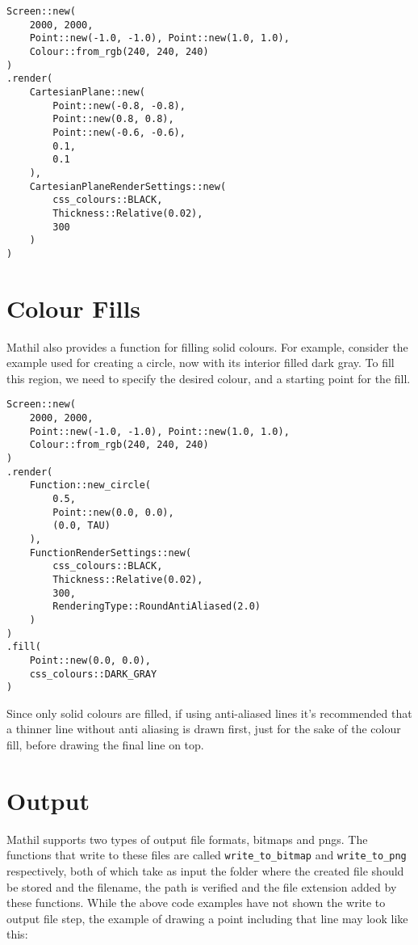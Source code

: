 \begin{lstlisting}
Screen::new(
    2000, 2000,
    Point::new(-1.0, -1.0), Point::new(1.0, 1.0),
    Colour::from_rgb(240, 240, 240)
)
.render(
    CartesianPlane::new(
        Point::new(-0.8, -0.8),
        Point::new(0.8, 0.8),
        Point::new(-0.6, -0.6),
        0.1,
        0.1
    ),
    CartesianPlaneRenderSettings::new(
        css_colours::BLACK,
        Thickness::Relative(0.02),
        300
    )
)
\end{lstlisting}


\section{Colour Fills}

Mathil also provides a function for filling solid colours. For example, consider the example used for creating a circle, now with its interior filled dark gray. To fill this region, we need to specify the desired colour, and a starting point for the fill.

\begin{lstlisting}
Screen::new(
    2000, 2000,
    Point::new(-1.0, -1.0), Point::new(1.0, 1.0),
    Colour::from_rgb(240, 240, 240)
)
.render(
    Function::new_circle(
        0.5,
        Point::new(0.0, 0.0),
        (0.0, TAU)
    ),
    FunctionRenderSettings::new(
        css_colours::BLACK,
        Thickness::Relative(0.02),
        300,
        RenderingType::RoundAntiAliased(2.0)
    )
)
.fill(
    Point::new(0.0, 0.0),
    css_colours::DARK_GRAY
)
\end{lstlisting}


Since only solid colours are filled, if using anti-aliased lines it's recommended that a thinner line without anti aliasing is drawn first, just for the sake of the colour fill, before drawing the final line on top.

\section{Output}

Mathil supports two types of output file formats, bitmaps and pngs. The functions that write to these files are called \verb|write_to_bitmap| and \verb|write_to_png| respectively, both of which take as input the folder where the created file should be stored and the filename, the path is verified and the file extension added by these functions. While the above code examples have not shown the write to output file step, the example of drawing a point including that line may look like this:

